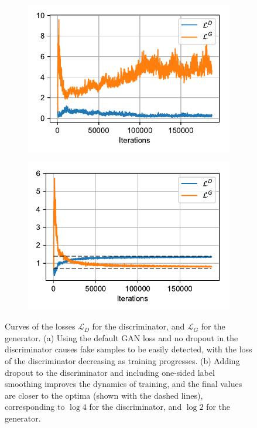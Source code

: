 \documentclass{article}
\begin{document}
\begin{figure}[t]
\begin{subfigure}{0.49\textwidth}
\centering
\includegraphics[scale=0.72]{img/gan_default_curves.pdf}
\caption{}
\end{subfigure}
\begin{subfigure}{0.49\textwidth}
\centering
\includegraphics[scale=0.72]{img/gan_improved_curves.pdf}
\caption{}
\end{subfigure}
 \caption{Curves of the losses $\mathcal{L}_D$ for the discriminator, and $\mathcal{L}_G$ for the generator. (a) Using the default GAN loss and no dropout in the discriminator causes fake samples to be easily detected, with the loss of the discriminator decreasing as training progresses. (b) Adding dropout to the discriminator and including one-sided label smoothing improves the dynamics of training, and the final values are closer to the optima (shown with the dashed lines), corresponding to $\log 4$ for the discriminator, and $\log 2$ for the generator.}
\label{fig:gan_curves}
\end{figure}
\end{document}
